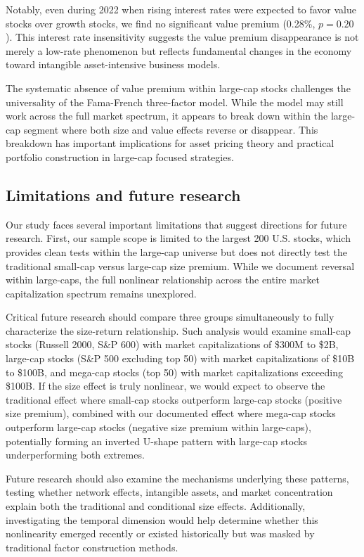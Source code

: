 \documentclass[10pt,letterpaper]{article}
\begin{document}
Notably, even during 2022 when rising interest rates were expected to favor value stocks over growth stocks, we find no significant value premium (0.28\%, $p=0.20$). This interest rate insensitivity suggests the value premium disappearance is not merely a low-rate phenomenon but reflects fundamental changes in the economy toward intangible asset-intensive business models.

The systematic absence of value premium within large-cap stocks challenges the universality of the Fama-French three-factor model. While the model may still work across the full market spectrum, it appears to break down within the large-cap segment where both size and value effects reverse or disappear. This breakdown has important implications for asset pricing theory and practical portfolio construction in large-cap focused strategies.

\subsection*{Limitations and future research}

Our study faces several important limitations that suggest directions for future research. First, our sample scope is limited to the largest 200 U.S. stocks, which provides clean tests within the large-cap universe but does not directly test the traditional small-cap versus large-cap size premium. While we document reversal within large-caps, the full nonlinear relationship across the entire market capitalization spectrum remains unexplored.

Critical future research should compare three groups simultaneously to fully characterize the size-return relationship. Such analysis would examine small-cap stocks (Russell 2000, S\&P 600) with market capitalizations of \$300M to \$2B, large-cap stocks (S\&P 500 excluding top 50) with market capitalizations of \$10B to \$100B, and mega-cap stocks (top 50) with market capitalizations exceeding \$100B. If the size effect is truly nonlinear, we would expect to observe the traditional effect where small-cap stocks outperform large-cap stocks (positive size premium), combined with our documented effect where mega-cap stocks outperform large-cap stocks (negative size premium within large-caps), potentially forming an inverted U-shape pattern with large-cap stocks underperforming both extremes.

Future research should also examine the mechanisms underlying these patterns, testing whether network effects, intangible assets, and market concentration explain both the traditional and conditional size effects. Additionally, investigating the temporal dimension would help determine whether this nonlinearity emerged recently or existed historically but was masked by traditional factor construction methods.
\end{document}
